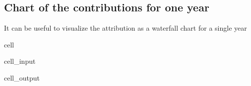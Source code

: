 \documentclass[letterpaper,10pt,english]{jupyterBook}
\begin{document}
\subsection{Chart of the contributions for one year}
\label{\detokenize{content/06_ModelAnalytics/Attribution:chart-of-the-contributions-for-one-year}}
\sphinxAtStartPar
It can be useful to visualize the attribution as a waterfall chart for a single year

\begin{sphinxuseclass}{cell}\begin{sphinxVerbatimInput}

\begin{sphinxuseclass}{cell_input}
\begin{sphinxVerbatim}[commandchars=\\\{\}]
  
\end{sphinxVerbatim}

\end{sphinxuseclass}\end{sphinxVerbatimInput}
\begin{sphinxVerbatimOutput}

\begin{sphinxuseclass}{cell_output}
\noindent{}

\end{sphinxuseclass}\end{sphinxVerbatimOutput}

\end{sphinxuseclass}
\end{document}
